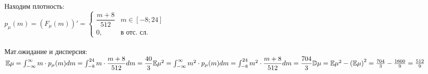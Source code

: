 \\
Находим плотность:
\\
$
p_{\mu}(m) = (F_{\mu}(m))' = \begin{cases}
    \dfrac{m+8}{512}& m\in [-8; 24]\\
    0, & \text{в отс. сл.}
\end{cases}
$\\
\\Мат.ожидание и дисперсия:\\
$
    \mathbb E\mu = \int_{-\infty}^{\infty}m\cdot p_{\mu}(m)dm = \int_{-8}^{24}m\cdot \dfrac{m+8}{512}dm = \dfrac{40}{3}\\
    \mathbb E\mu^2 = \int_{-\infty}^{\infty}m^2\cdot p_{\mu}(m)dm = \int_{-8}^{24}m^2\cdot \dfrac{m+8}{512}dm = \dfrac{704}{3}\\
    \mathbb D\mu = \mathbb E\mu^2 - \left(\mathbb E\mu\right)^2 = \frac{704}{3} - \frac{1600}{9} = \frac{512}{9}\\
$
